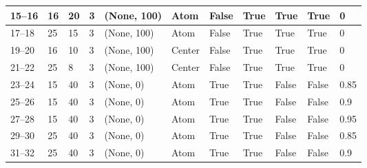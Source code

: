 \begin{longtable}{|C{0.9cm}|C{0.8cm}|C{0.8cm}|C{0.8cm}|C{3cm}|C{1.5cm}|C{1.5cm}|C{0.8cm}|C{0.8cm}|C{1cm}|C{1cm}|}
    15--16 &  16 &  20 &  3 & (None, 100) & Atom & False & True & True & True & 0 \\ \hline

    17--18 &  25 &  15 &  3 & (None, 100) & Atom & False & True & True & True & 0 \\ \hline

    19--20 &  16 &  10 &  3 & (None, 100) & Center & False & True & True & True & 0 \\ \hline

    21--22 &  25 &  8 &  3 & (None, 100) & Center & False & True & True & True & 0 \\ \hline

    23--24 &  15 &  40 &  3 & (None, 0) & Atom & True & True & False & False & 0.85 \\ \hline

    25--26 &  15 &  40 &  3 & (None, 0) & Atom & True & True & False & False & 0.9 \\ \hline

    27--28 &  15 &  40 &  3 & (None, 0) & Atom & True & True & False & False & 0.95 \\ \hline

    29--30 &  25 &  40 &  3 & (None, 0) & Atom & True & True & False & False & 0.85 \\ \hline

    31--32 &  25 &  40 &  3 & (None, 0) & Atom & True & True & False & False & 0.9 \\ \hline


\end{longtable}
